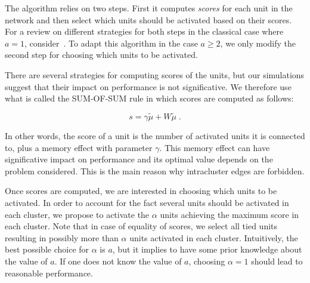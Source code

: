 \documentclass[english,10pt,twocolumn]{IEEEtran}
\renewcommand{\ge}{\geqslant}
\theoremstyle{definition}
\begin{document}
        The algorithm relies on two steps. First it computes \emph{scores} for each unit in the network and then select which units should be activated based on their scores. For a review on different strategies for both steps in the classical case where $a=1$, consider~\cite{Ala}. To adapt this algorithm in the case $a\ge 2$, we only modify the second step for choosing which units to be activated.

        There are several strategies for computing scores of the units, but our simulations suggest that their impact on performance is not significative. We therefore use what is called the SUM-OF-SUM rule in which scores are computed as follows:

\[
s = \gamma \tilde{\mu} + W \tilde{\mu}\;.
\]

In other words, the score of a unit is the number of activated units it is connected to, plus a memory effect with parameter $\gamma$. This memory effect can have significative impact on performance and its optimal value depends on the problem considered. This is the main reason why intracluster edges are forbidden.

        Once scores are computed, we are interested in choosing which units to be activated. In order to account for the fact several units should be activated in each cluster, we propose to activate the $\alpha$ units achieving the maximum score in each cluster. Note that in case of equality of scores, we select all tied units resulting in possibly more than $\alpha$ units activated in each cluster. Intuitively, the best possible choice for $\alpha$ is $a$, but it implies to have some prior knowledge about the value of $a$. If one does not know the value of $a$, choosing $\alpha=1$ should lead to reasonable performance.

		
		
		
		
\end{document}

